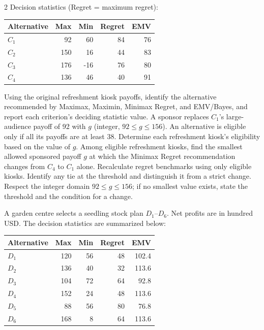 \begin{multicols}{2}
Decision statistics (Regret = maximum regret):

\begin{center}\small\setlength{\tabcolsep}{4pt}
	\begin{tabular}{lrrrr}\toprule
		Alternative & Max & Min & Regret & EMV\\ \midrule
				$C_1$ & 92 & 60 & 84 & 76\\
		$C_2$ & 150 & 16 & 44 & 83\\
		$C_3$ & 176 & -16 & 76 & 80\\
		$C_4$ & 136 & 46 & 40 & 91\\
		\bottomrule
	\end{tabular}
\end{center}

\noindent Using the original refreshment kiosk payoffs, identify the alternative recommended by Maximax, Maximin, Minimax Regret, and EMV/Bayes, and report each criterion's deciding statistic value.  A sponsor replaces $C_1$'s large-audience payoff of 92 with $g$ (integer, $92\leq g\leq156$). An alternative is eligible only if all its payoffs are at least 38. Determine each refreshment kiosk's eligibility based on the value of $g$.  Among eligible refreshment kiosks, find the smallest allowed sponsored payoff $g$ at which the Minimax Regret recommendation changes from $C_4$ to $C_1$ alone. Recalculate regret benchmarks using only eligible kiosks. Identify any tie at the threshold and distinguish it from a strict change. Respect the integer domain $92\leq g\leq156$; if no smallest value exists, state the threshold and the condition for a change. 

A garden centre selects a seedling stock plan $D_1$--$D_6$. Net profits are in hundred USD. The decision statistics are summarized below:

\vspace{-3mm}
\begin{center}\small\setlength{\tabcolsep}{4pt}
	\begin{tabular}{lrrrr}\toprule
		Alternative & Max & Min & Regret & EMV\\ \midrule
		$D_1$ & 120 & 56 & 48 & 102.4\\
		$D_2$ & 136 & 40 & 32 & 113.6\\
		$D_3$ & 104 & 72 & 64 & 92.8\\
		$D_4$ & 152 & 24 & 48 & 113.6\\
		$D_5$ & 88 & 56 & 80 & 76.8\\
		$D_6$ & 168 & 8 & 64 & 113.6\\
		\bottomrule
	\end{tabular}
\end{center}
\vspace{-3mm}


\end{multicols}
